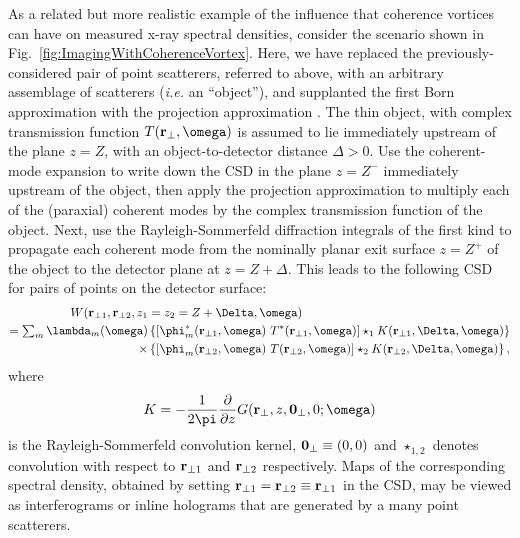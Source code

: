 \documentclass{iucr}              %
\begin{document}
As a related but more realistic example of the  influence that coherence vortices can have on measured x-ray spectral densities, consider the scenario shown in Fig.~\ref{fig:ImagingWithCoherenceVortex}.  Here, we have replaced the previously-considered pair of point scatterers, referred to above, with an arbitrary assemblage of scatterers ({\em i.e.} an ``object''), and supplanted the first Born approximation with the projection approximation \cite{paganin_book}.  The thin object, with complex transmission function $T({\bf r}_{\perp},\omega)$ is assumed to lie immediately upstream of the plane $z=Z$, with an object-to-detector distance $\Delta > 0$.  Use the coherent-mode expansion to write down the CSD in the plane $z=Z^-$ immediately upstream of the object, then apply the projection approximation to multiply each of the (paraxial) coherent modes by the complex transmission function of the object.  Next, use the Rayleigh-Sommerfeld diffraction integrals of the first kind \cite{Rayleigh, Sommerfeld, mandel_wolf} to propagate each coherent mode from the nominally planar exit surface $z=Z^+$ of the object to the detector plane at $z=Z+\Delta$.  This leads to the following CSD for pairs of points on the detector surface:     
\begin{equation}
\begin{aligned}
\label{eq:CSD_with_object_and_detector}
W ({\bf r}_{\perp 1}, {\bf r}_{\perp 2},z_1 &=z_2=Z+\Delta,\omega) \\ =\sum_m \lambda_m({\omega}) & \left\{ [\phi_m^*({\bf r}_{\perp 1},\omega)~T^*({\bf r}_{\perp 1},\omega)]\star_1 K({\bf r}_{\perp 1},\Delta,\omega)\right\} \\ \times & \left\{ [\phi_m({\bf r}_{\perp 2},\omega)~T({\bf r}_{\perp 2},\omega)]\star_2 K({\bf r}_{\perp 2},\Delta,\omega)\right\},
\end{aligned}
\end{equation}
where 
\begin{equation}
K=-\frac{1}{2\pi} \frac{\partial}{\partial z} G({\bf r}_{\perp},z,{\bf 0}_{\perp},0;\omega) 
\end{equation}
is the Rayleigh-Sommerfeld convolution kernel, ${\bf 0}_{\perp}\equiv (0,0)$ and $\star_{1,2}$ denotes convolution with respect to ${\bf r}_{\perp 1}$ and ${\bf r}_{\perp 2}$ respectively.  Maps of the corresponding spectral density, obtained by setting ${\bf r}_{\perp 1}={\bf r}_{\perp 2}\equiv{\bf r}_{\perp 1}$ in the CSD, may be viewed as interferograms or inline holograms that are generated by a many point scatterers.   
\end{document}
